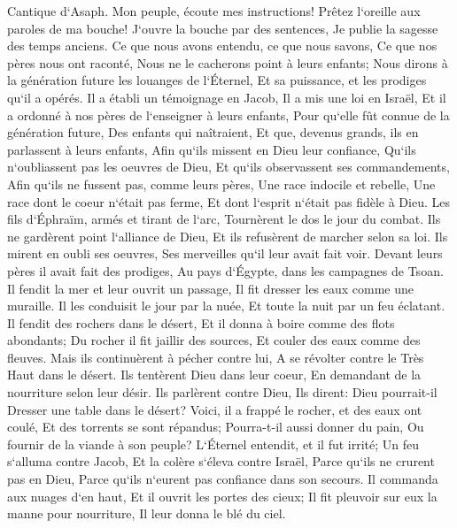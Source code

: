 \verse Cantique d`Asaph. Mon peuple, écoute mes instructions! Prêtez l`oreille aux paroles de ma bouche! 
\verse J`ouvre la bouche par des sentences, Je publie la sagesse des temps anciens. 
\verse Ce que nous avons entendu, ce que nous savons, Ce que nos pères nous ont raconté, 
\verse Nous ne le cacherons point à leurs enfants; Nous dirons à la génération future les louanges de l`Éternel, Et sa puissance, et les prodiges qu`il a opérés. 
\verse Il a établi un témoignage en Jacob, Il a mis une loi en Israël, Et il a ordonné à nos pères de l`enseigner à leurs enfants, 
\verse Pour qu`elle fût connue de la génération future, Des enfants qui naîtraient, Et que, devenus grands, ils en parlassent à leurs enfants, 
\verse Afin qu`ils missent en Dieu leur confiance, Qu`ils n`oubliassent pas les oeuvres de Dieu, Et qu`ils observassent ses commandements, 
\verse Afin qu`ils ne fussent pas, comme leurs pères, Une race indocile et rebelle, Une race dont le coeur n`était pas ferme, Et dont l`esprit n`était pas fidèle à Dieu. 
\verse Les fils d`Éphraïm, armés et tirant de l`arc, Tournèrent le dos le jour du combat. 
\verse Ils ne gardèrent point l`alliance de Dieu, Et ils refusèrent de marcher selon sa loi. 
\verse Ils mirent en oubli ses oeuvres, Ses merveilles qu`il leur avait fait voir. 
\verse Devant leurs pères il avait fait des prodiges, Au pays d`Égypte, dans les campagnes de Tsoan. 
\verse Il fendit la mer et leur ouvrit un passage, Il fit dresser les eaux comme une muraille. 
\verse Il les conduisit le jour par la nuée, Et toute la nuit par un feu éclatant. 
\verse Il fendit des rochers dans le désert, Et il donna à boire comme des flots abondants; 
\verse Du rocher il fit jaillir des sources, Et couler des eaux comme des fleuves. 
\verse Mais ils continuèrent à pécher contre lui, A se révolter contre le Très Haut dans le désert. 
\verse Ils tentèrent Dieu dans leur coeur, En demandant de la nourriture selon leur désir. 
\verse Ils parlèrent contre Dieu, Ils dirent: Dieu pourrait-il Dresser une table dans le désert? 
\verse Voici, il a frappé le rocher, et des eaux ont coulé, Et des torrents se sont répandus; Pourra-t-il aussi donner du pain, Ou fournir de la viande à son peuple? 
\verse L`Éternel entendit, et il fut irrité; Un feu s`alluma contre Jacob, Et la colère s`éleva contre Israël, 
\verse Parce qu`ils ne crurent pas en Dieu, Parce qu`ils n`eurent pas confiance dans son secours. 
\verse Il commanda aux nuages d`en haut, Et il ouvrit les portes des cieux; 
\verse Il fit pleuvoir sur eux la manne pour nourriture, Il leur donna le blé du ciel. 
